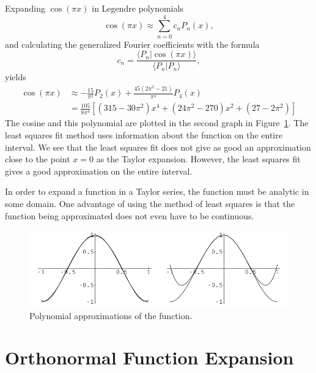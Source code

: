 \begin{Example}
  Expanding $\cos(\pi x)$ in Legendre polynomials
  \[ \cos(\pi x) \approx \sum_{n=0}^4 c_n P_n(x), \]
  and calculating the generalized Fourier coefficients with the formula
  \[ c_n = \frac{\langle P_n | \cos(\pi x) \rangle}{\langle P_n | P_n \rangle}, \]
  yields 
  \begin{align*}
    \cos(\pi x) &\approx - \frac{15}{\pi^2} P_2(x) + \frac{45(2\pi^2-21)}{\pi^4}
    P_4(x) \\
    &= \frac{105}{8\pi^4} [(315-30\pi^2)x^4 + (24\pi^2 - 270)x^2 + 
    (27 - 2\pi^2)]
  \end{align*}
  The cosine and this polynomial are plotted in the second graph in
  Figure~\ref{least_cos}.  The least squares fit method uses information
  about the function on the entire interval.  We see that the least
  squares fit does not give as good an approximation close to the
  point $x=0$ as the Taylor expansion.  However, the least squares fit gives a
  good approximation on the entire interval.  

  In order to expand a function in a Taylor series, the function must be analytic
  in some domain.  One advantage of using the method of least squares is that the
  function being approximated does not even have to be continuous.

  \begin{figure}[h!]
    \begin{center}
      \includegraphics[width=\textwidth]{ode/hilbert/least}
    \end{center}
    \caption{Polynomial approximations of the function.}
    \label{least_cos}
  \end{figure}


\end{Example}





\section{Orthonormal Function Expansion}

